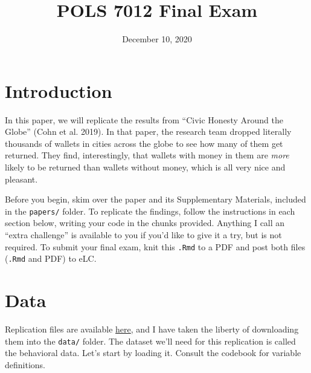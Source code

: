 \documentclass[12pt,halfline,a4paper,]{ouparticle}
\begin{document}
\title{POLS 7012 Final Exam}

\author{%
\address{University of Georgia}
\and
{}\address{University of Georgia}
}

\abstract{}

\date{December 10, 2020}

\keywords{}

\maketitle



\hypertarget{introduction}{%
\section{Introduction}\label{introduction}}

In this paper, we will replicate the results from ``Civic Honesty Around
the Globe'' (Cohn et al. 2019). In that paper, the research team dropped
literally thousands of wallets in cities across the globe to see how
many of them get returned. They find, interestingly, that wallets with
money in them are \emph{more} likely to be returned than wallets without
money, which is all very nice and pleasant.

Before you begin, skim over the paper and its Supplementary Materials,
included in the \texttt{papers/} folder. To replicate the findings,
follow the instructions in each section below, writing your code in the
chunks provided. Anything I call an ``extra challenge'' is available to
you if you'd like to give it a try, but is not required. To submit your
final exam, knit this \texttt{.Rmd} to a PDF and post both files
(\texttt{.Rmd} and PDF) to eLC.

\hypertarget{data}{%
\section{Data}\label{data}}

Replication files are available
\href{https://dataverse.harvard.edu/dataverse/honesty}{here}, and I have
taken the liberty of downloading them into the \texttt{data/} folder.
The dataset we'll need for this replication is called the behavioral
data. Let's start by loading it. Consult the codebook for variable
definitions.
\end{document}
